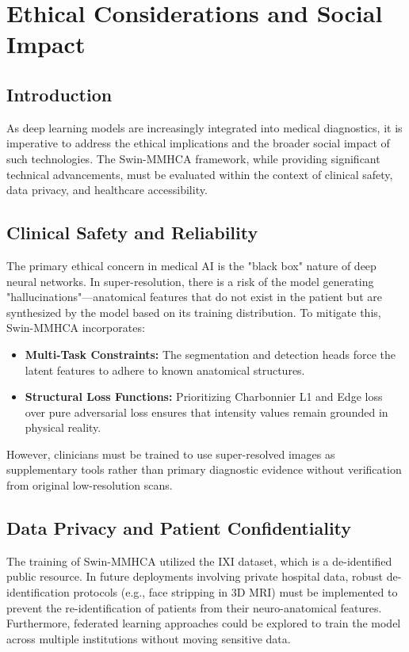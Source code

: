\chapter{Ethical Considerations and Social Impact}

\section{Introduction}
As deep learning models are increasingly integrated into medical diagnostics, it is imperative to address the ethical implications and the broader social impact of such technologies. The Swin-MMHCA framework, while providing significant technical advancements, must be evaluated within the context of clinical safety, data privacy, and healthcare accessibility.

\section{Clinical Safety and Reliability}
The primary ethical concern in medical AI is the "black box" nature of deep neural networks. In super-resolution, there is a risk of the model generating "hallucinations"—anatomical features that do not exist in the patient but are synthesized by the model based on its training distribution. 
To mitigate this, Swin-MMHCA incorporates:
\begin{itemize}
    \item \textbf{Multi-Task Constraints:} The segmentation and detection heads force the latent features to adhere to known anatomical structures.
    \item \textbf{Structural Loss Functions:} Prioritizing Charbonnier L1 and Edge loss over pure adversarial loss ensures that intensity values remain grounded in physical reality.
\end{itemize}
However, clinicians must be trained to use super-resolved images as supplementary tools rather than primary diagnostic evidence without verification from original low-resolution scans.

\section{Data Privacy and Patient Confidentiality}
The training of Swin-MMHCA utilized the IXI dataset, which is a de-identified public resource. In future deployments involving private hospital data, robust de-identification protocols (e.g., face stripping in 3D MRI) must be implemented to prevent the re-identification of patients from their neuro-anatomical features. Furthermore, federated learning approaches could be explored to train the model across multiple institutions without moving sensitive data.

